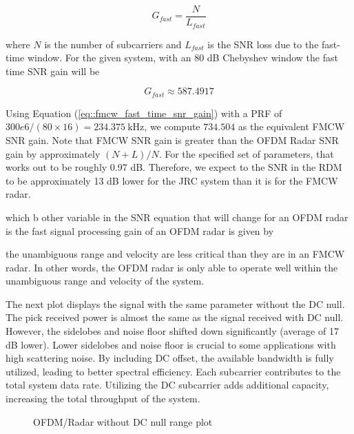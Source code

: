 \documentclass[conference]{IEEEtran}
\begin{document}
\begin{equation*}
	G_{fast} = \frac{N}{L_{fast}}
\end{equation*}

where $N$ is the number of subcarriers and $L_{fast}$ is the SNR loss due to the fast-time window. For the given system, with an 80 dB Chebyshev window the fast time SNR gain will be

\begin{equation*}
	G_{fast} \approx 587.4917
\end{equation*}

Using Equation (\ref{eq::fmcw_fast_time_snr_gain}) with a PRF of $300e6/(80 \times 16) = 234.375\ \text{kHz}$, we compute $734.504$ as the equivalent FMCW SNR gain. Note that FMCW SNR gain is greater than the OFDM Radar SNR gain by approximately $(N + L)/N$. For the specified set of parameters, that works out to be roughly 0.97 dB. Therefore, we expect to the SNR in the RDM to be approximately 13 dB lower for the JRC system than it is for the FMCW radar.

which  b other variable in the SNR equation that will change for an OFDM radar is the fast signal processing gain of an OFDM radar is given by 

the unambiguous range and velocity are less critical than they are in an FMCW radar. In other words, the OFDM radar is only able to operate well within the unambiguous range and velocity of the system.


The next plot displays the signal with the same parameter without the DC null. The pick received power is almost the same as the signal received with DC null. However, the sidelobes and noise floor shifted down significantly (average of 17 dB lower). Lower sidelobes and noise floor is crucial to some applications with high scattering noise. By including DC offset, the available bandwidth is fully utilized, leading to better spectral efficiency. Each subcarrier contributes to the total system data rate. Utilizing the DC subcarrier adds additional capacity, increasing the total throughput of the system.

\begin{figure}[H]
\centering
{}
\caption{OFDM/Radar without DC null range plot}
\end{figure}
\end{document}
